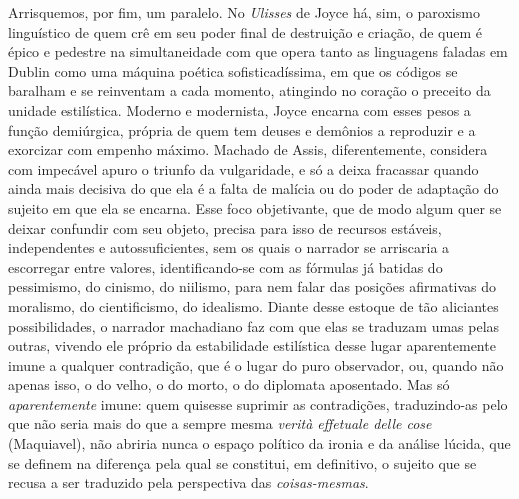 Arrisquemos, por fim, um paralelo. No \emph{Ulisses} de Joyce há, sim, o
paroxismo linguístico de quem crê em seu poder final de destruição e
criação, de quem é épico e pedestre na simultaneidade com que opera
tanto as linguagens faladas em Dublin como uma máquina poética
sofisticadíssima, em que os códigos se baralham e se reinventam a cada
momento, atingindo no coração o preceito da unidade estilística. Moderno
e modernista, Joyce encarna com esses pesos a função demiúrgica, própria
de quem tem deuses e demônios a reproduzir e a exorcizar com empenho
máximo. Machado de Assis, diferentemente, considera com impecável apuro
o triunfo da vulgaridade, e só a deixa fracassar quando ainda mais
decisiva do que ela é a falta de malícia ou do poder de adaptação do
sujeito em que ela se encarna. Esse foco objetivante, que de modo algum
quer se deixar confundir com seu objeto, precisa para isso de recursos
estáveis, independentes e autossuficientes, sem os quais o narrador se
arriscaria a escorregar entre valores, identificando-se com as fórmulas
já batidas do pessimismo, do cinismo, do niilismo, para nem falar das
posições afirmativas do moralismo, do cientificismo, do idealismo.
Diante desse estoque de tão aliciantes possibilidades, o narrador
machadiano faz com que elas se traduzam umas pelas outras, vivendo ele
próprio da estabilidade estilística desse lugar aparentemente imune a
qualquer contradição, que é o lugar do puro observador, ou, quando não
apenas isso, o do velho, o do morto, o do diplomata aposentado. Mas só
\emph{aparentemente} imune: quem quisesse suprimir as contradições,
traduzindo-as pelo que não seria mais do que a sempre mesma \emph{verità
effetuale delle cose} (Maquiavel), não abriria nunca o espaço político
da ironia e da análise lúcida, que se definem na diferença pela qual se
constitui, em definitivo, o sujeito que se recusa a ser traduzido pela
perspectiva das \emph{coisas-mesmas}.
